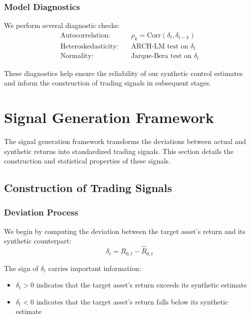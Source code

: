 \subsubsection{Model Diagnostics}
We perform several diagnostic checks:
\begin{equation}
\begin{aligned}
    \text{Autocorrelation}: &\quad \rho_k = \text{Corr}(\delta_t, \delta_{t-k}) \\
    \text{Heteroskedasticity}: &\quad \text{ARCH-LM test on } \delta_t \\
    \text{Normality}: &\quad \text{Jarque-Bera test on } \delta_t
\end{aligned}
\end{equation}

These diagnostics help ensure the reliability of our synthetic control estimates and inform the construction of trading signals in subsequent stages.

\section{Signal Generation Framework}

The signal generation framework transforms the deviations between actual and synthetic returns into standardized trading signals. This section details the construction and statistical properties of these signals.

\subsection{Construction of Trading Signals}

\subsubsection{Deviation Process}
We begin by computing the deviation between the target asset's return and its synthetic counterpart:
\begin{equation}
    \delta_t = R_{0,t} - \hat{R}_{0,t}
\end{equation}

The sign of $\delta_t$ carries important information:
\begin{itemize}
    \item $\delta_t > 0$ indicates that the target asset's return exceeds its synthetic estimate
    \item $\delta_t < 0$ indicates that the target asset's return falls below its synthetic estimate
\end{itemize}

